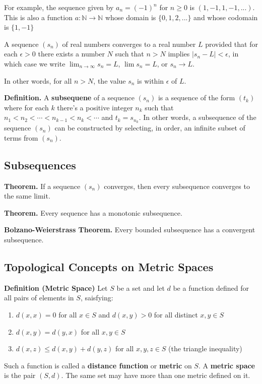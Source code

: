 \documentclass[12pt]{article}
\newcommand{\N}{\mathbb{N}}
\begin{document}
For example, the sequence given by $a_{n}=(-1)^{n}$ for $n \geq 0$ is $(1, -1, 1, -1, ...)$. This is also a function $a : \N \to \N$ whose domain is $\{0, 1, 2, ...\}$ and whose codomain is $\{1, -1\}$

A sequence $(s_{n})$ of real numbers converges to a real number $L$ provided that for each $\epsilon > 0$ there exists a number $N$ such that $n > N$ implies $|s_{n} - L| < \epsilon $, in which case we write $\displaystyle{\lim_{n \to \infty}} s_{n} = L$, $\lim s_{n} = L$, or $s_{n} \to L$.

In other words, for all $n > N$, the value $s_{n}$ is within $\epsilon$ of $L$.

\textbf{Definition.} A \textbf{subsequene} of a sequence $(s_{n})$ is a sequence of the form $(t_{k})$ where for each $k$ there's a positive integer $n_{k}$ such that $n_{1}<n_{2}< \cdots <n_{k-1}<n_{k}< \cdots$ and $t_{k} = s_{n_{k}}$. In other words, a subsequence of the sequence $(s_{n})$ can be constructed by selecting, in order, an infinite subset of terms from $(s_{n})$.

\subsection{Subsequences}

\textbf{Theorem.} If a sequence $(s_{n})$ converges, then every subsequence converges to the same limit.

\textbf{Theorem.} Every sequence has a monotonic subsequence.

\textbf{Bolzano-Weierstrass Theorem.} Every bounded subsequence has a convergent subsequence.

\subsection{Topological Concepts on Metric Spaces}

\textbf{Definition (Metric Space)} Let $S$ be a set and let $d$ be a function defined for all pairs of elements in $S$, saisfying: \begin{enumerate}
    \item $d(x,x) = 0$ for all $x \in S$ and $d(x,y) > 0$ for all distinct $x, y \in S$
    \item $d(x,y) = d(y,x)$ for all $x, y \in S$
    \item $d(x,z) \leq d(x,y) + d(y,z)$ for all $x,y,z \in S$ (the triangle inequality)
\end{enumerate} Such a function is called a \textbf{distance function} or \textbf{metric} on $S$. A \textbf{metric space} is the pair $(S, d)$. The same set may have more than one metric defined on it.
\end{document}
